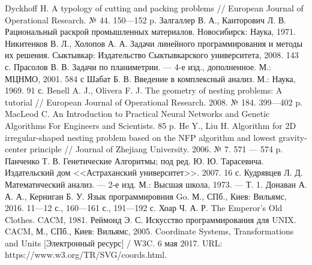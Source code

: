 \documentclass[14pt]{extarticle}
\begin{document}
	\begin{thebibliography}{1}
		 Dyckhoff H. A typology of cutting and packing problems // European Journal of Operational Research. № 44. 150---152 p.
		 Залгаллер В. А., Канторович Л. В. Рациональный раскрой промышленных материалов. Новосибирск: Наука, 1971.
		 Никитенков В. Л., Холопов А. А. Задачи линейного программирования и методы их решения. Сыктывкар: Издательство Сыктывкарского университета, 2008. 143 с.
		  Прасолов В. В. Задачи по планиметрии. --- 4-е изд., дополненное. М.: МЦНМО, 2001. 584 с 
		 Шабат Б. В. Введение в комплексный анализ. М.: Наука, 1969. 91 с.
		 Benell A. J., Olivera F. J. The geometry of nesting problems: A tutorial // European Journal of Operational Research. 2008. № 184. 399---402 p.
		 MacLeod C. An Introduction to Practical Neural Networks and Genetic Algorithms For Engineers and Scientists. 85 p.
		 He Y., Liu H. Algorithm for 2D irregular-shaped nesting problem based on the NFP algorithm and lowest gravity-center principle // Journal of Zhejiang University. 2006. № 7. 571 --- 574 p.
		 Панченко Т. В. Генетические Алгоритмы; под ред. Ю. Ю. Тарасевича. Издательский дом <<Астраханский университет>>. 2007. 16 с.
		 Кудрявцев Л. Д. Математический анализ. --- 2-е изд.  М.: Высшая школа, 1973. --- Т. 1.
		 Донаван А. А. А., Керниган Б. У. Язык программировния Go. М., СПб., Киев: Вильямс, 2016. 11---12 с., 160---161 с., 191---192 с.
		 Хоар Ч. А. Р. The Emperor’s Old Clothes. CACM, 1981.
		 Реймонд Э. С. Искусство программирования для UNIX. CACM, М., СПб., Киев: Вильямс, 2005.
		 Coordinate Systems, Transformations and Units [Электронный ресурс] / W3C. 6 мая 2017. URL: https://www.w3.org/TR/SVG/coords.html.
	\end{thebibliography}
\end{document}
